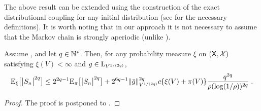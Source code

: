\documentclass[sn-mathphys,Numbered]{sn-jnl}%
\begin{document}
The above result can be extended using the construction of the exact distributional coupling for any initial distribution (see  for the necessary definitions). It is worth noting that in our approach it is not necessary to assume that the Markov chain is strongly aperiodic (unlike \cite{adamczak2015exponential}).
\begin{theorem}
\label{theo:changeofmeasure}
Assume ,  and let $q \in \nset^*$. Then, for any probability measure $\xi$ on $(\Xset,\Xsigma)$ satisfying $\xi(V) < \infty$ and
$g \in \mrl_{V^{1/(2q)}}$,
\begin{equation*}
\PE_\xi\big[ \big|S_n \big|^{2q} \big] \leq 2^{2q-1} \PE_\pi\big[ \big|S_n \big|^{2q} \big]  + 2^{6q-1} \Vnorm[V^{1/(2q)}]{\bar{g}}^{2q} \cmconstv \{ \xi(V) + \pi(V) \} \frac{q^{2q}}{\ratev (\log(1/\ratev))^{2q}}\eqsp.
\end{equation*}
\end{theorem}
\begin{proof}
  The proof is postponed to .
\end{proof}
\end{document}
